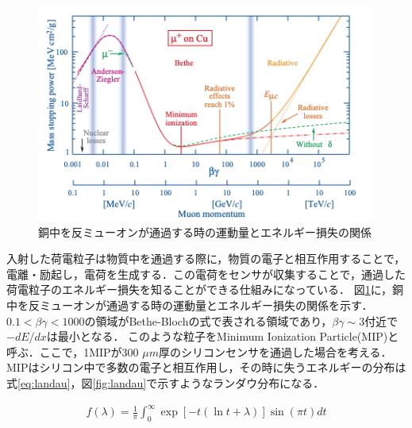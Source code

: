 \begin{figure}[h]
  \centering
  \includegraphics[width=13cm]{./figure/BB.png}
  \caption{銅中を反ミューオンが通過する時の運動量とエネルギー損失の関係\cite{Tanabashi:2018oca}}
  \label{fig:bb}
\end{figure}

入射した荷電粒子は物質中を通過する際に，物質の電子と相互作用することで，電離・励起し，電荷を生成する．この電荷をセンサが収集することで，通過した荷電粒子のエネルギー損失を知ることができる仕組みになっている．
図\ref{fig:bb}に，銅中を反ミューオンが通過する時の運動量とエネルギー損失の関係を示す．$0.1 < \beta \gamma <1000$の領域がBethe-Blochの式で表される領域であり，$\beta \gamma \sim 3$付近で$-dE/dx$は最小となる．
このような粒子をMinimum Ionization Particle(MIP)と呼ぶ．ここで，1MIPが300 $\mu m$厚のシリコンセンサを通過した場合を考える．MIPはシリコン中で多数の電子と相互作用し，その時に失うエネルギーの分布は式\ref{eq:landau}，図\ref{fig:landau}で示すようなランダウ分布になる．

\begin{eqnarray}
  \label{eq:landau}
  f(\lambda) = \frac{1}{\pi} \int ^{\infty} _0 \exp[-t (\ln t+\lambda) ] \sin(\pi t) dt
\end{eqnarray}

